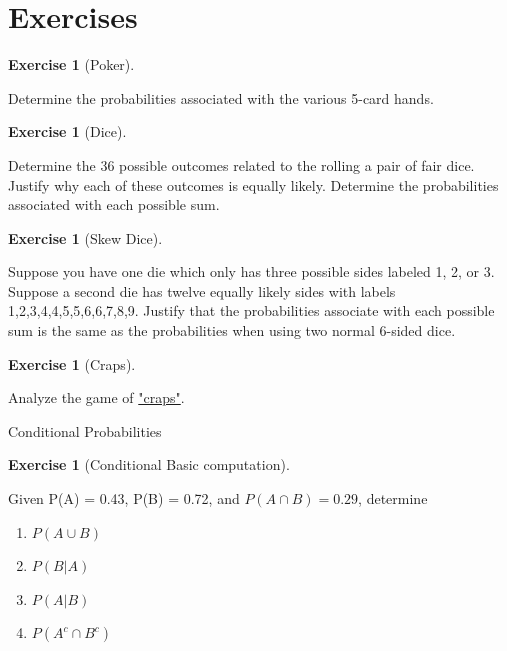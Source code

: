 \documentclass[10pt,]{book}
\theoremstyle{plain}
\theoremstyle{definition}
\theoremstyle{definition}
\theoremstyle{definition}
\newtheorem{exercise}[theorem]{Exercise}
\numberwithin{equation}{section}
\begin{document}
\section[{Exercises}]{Exercises}\label{section-23}
\begin{exercise}[{Poker}]\label{exercise-13}

	Determine the probabilities associated with the various 5-card hands.
\end{exercise}
\begin{exercise}[{Dice}]\label{exercise-14}

	Determine the 36 possible outcomes related to the rolling a pair of fair dice. Justify why each of these outcomes is equally likely. Determine the probabilities associated with each possible sum.
\end{exercise}
\begin{exercise}[{Skew Dice}]\label{exercise-15}

	Suppose you have one die which only has three possible sides labeled 1, 2, or 3. Suppose a second die has twelve equally likely sides with labels 1,2,3,4,4,5,5,6,6,7,8,9.  Justify that the probabilities associate with each possible sum is the same as the probabilities when using two normal 6-sided dice.
\end{exercise}
\begin{exercise}[{Craps}]\label{exercise-16}

	Analyze the game of
	\href{http://mathworld.wolfram.com/Craps.html}{"craps"}.
\end{exercise}
Conditional Probabilities%
\begin{exercise}[{Conditional Basic computation}]\label{exercise-17}

	Given P(A) = 0.43, P(B) = 0.72, and \(P(A \cap B) = 0.29\), determine
	\leavevmode%
\begin{enumerate}
\item\hypertarget{li-116}{}\(P(A \cup B)\)%
\item\hypertarget{li-117}{}\(P(B | A)\)%
\item\hypertarget{li-118}{}\(P(A | B)\)%
\item\hypertarget{li-119}{}\(P(A^c \cap B^c)\)%
\end{enumerate}

\end{exercise}
\end{document}

